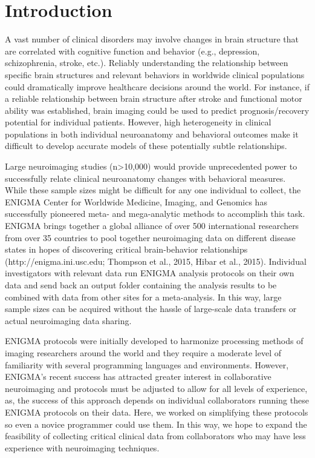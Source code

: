 \documentclass[twocolumn]{bmcart}%
\begin{document}
\section{Introduction}\label{introduction}

A vast number of clinical disorders may involve changes in brain
structure that are correlated with cognitive function and behavior
(e.g., depression, schizophrenia, stroke, etc.). Reliably understanding
the relationship between specific brain structures and relevant
behaviors in worldwide clinical populations could dramatically improve
healthcare decisions around the world. For instance, if a reliable
relationship between brain structure after stroke and functional motor
ability was established, brain imaging could be used to predict
prognosis/recovery potential for individual patients. However, high
heterogeneity in clinical populations in both individual neuroanatomy
and behavioral outcomes make it difficult to develop accurate models of
these potentially subtle relationships.

Large neuroimaging studies (n\textgreater{}10,000) would provide
unprecedented power to successfully relate clinical neuroanatomy changes
with behavioral measures. While these sample sizes might be difficult
for any one individual to collect, the ENIGMA Center for Worldwide
Medicine, Imaging, and Genomics has successfully pioneered meta- and
mega-analytic methods to accomplish this task. ENIGMA brings together a
global alliance of over 500 international researchers from over 35
countries to pool together neuroimaging data on different disease states
in hopes of discovering critical brain-behavior relationships
(http://enigma.ini.usc.edu; Thompson et al., 2015, Hibar et al., 2015). Individual
investigators with relevant data run ENIGMA analysis protocols on their
own data and send back an output folder containing the analysis results
to be combined with data from other sites for a meta-analysis. In this
way, large sample sizes can be acquired without the hassle of
large-scale data transfers or actual neuroimaging data sharing.

ENIGMA protocols were initially developed to harmonize processing
methods of imaging researchers around the world and they require a
moderate level of familiarity with several programming languages and
environments. However, ENIGMA's recent success has attracted greater
interest in collaborative neuroimaging and protocols must be adjusted to
allow for all levels of experience, as, the success of this approach
depends on individual collaborators running these ENIGMA protocols on
their data. Here, we worked on simplifying these protocols so even a
novice programmer could use them. In this way, we hope to expand the
feasibility of collecting critical clinical data from collaborators who
may have less experience with neuroimaging techniques.
\end{document}
